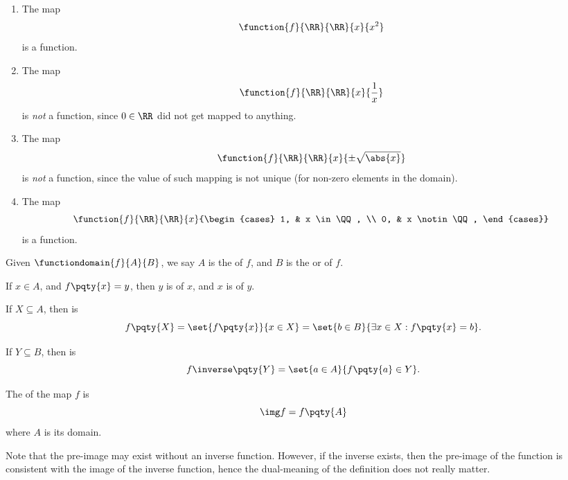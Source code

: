 \begin{examples}
    \begin{enumerate}
        \item The map
        \[
            \function{f}{\RR}{\RR}{x}{x^2}
        \]
        is a function.

        \item The map
        \[
            \function{f}{\RR}{\RR}{x}{\frac{1}{x}}
        \]
        is \emph{not} a function, since \(0 \in \RR\) did not get mapped to anything.

        \item The map
        \[
            \function{f}{\RR}{\RR}{x}{\pm \sqrt{\abs{x}}}
        \]
        is \emph{not} a function, since the value of such mapping is not unique (for non-zero elements in the domain).

        \item The map
        \[
            \function{f}{\RR}{\RR}{x}{\begin{cases}
                1, & x \in \QQ, \\
                0, & x \notin \QQ,
            \end{cases}}
        \]
        is a function.
    \end{enumerate}
\end{examples}

\begin{definition}
    Given \(\functiondomain{f}{A}{B}\), we say \(A\) is the  of \(f\), and \(B\) is the  or  of \(f\).

    If \(x \in A\), and \(f\pqty{x} = y\), then \(y\) is  of \(x\), and \(x\) is  of \(y\).

    If \(X \subseteq A\), then  is
    \[
        f\pqty{X} = \set{f\pqty{x}}{x \in X} = \set{b \in B}{\exists x \in X: f\pqty{x} = b}.
    \]

    If \(Y \subseteq B\), then  is
    \[
        f\inverse\pqty{Y} = \set{a \in A}{f\pqty{a} \in Y}.
    \]

    The  of the map \(f\) is
    \[
        \img f = f \pqty{A}
    \]
    where \(A\) is its domain.
\end{definition}

\begin{remark}
    Note that the pre-image may exist without an inverse function. However, if the inverse exists, then the pre-image of the function is consistent with the image of the inverse function, hence the dual-meaning of the definition does not really matter.
\end{remark}

